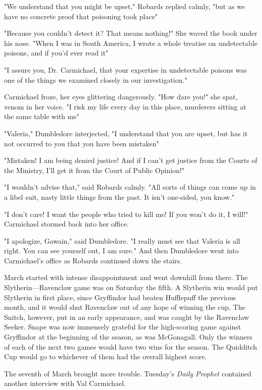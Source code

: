 "We understand that you might be upset," Robards replied calmly, "but as we have no concrete proof that poisoning took place{\el}"

"Because you couldn't detect it? That means nothing!" She waved the book under his nose. "When I was in South America, I wrote a whole treatise on undetectable poisons, and if you'd ever read it{\el}"

"I assure you, Dr. Carmichael, that your expertise in undetectable poisons was one of the things we examined closely in our investigation."

Carmichael froze, her eyes glittering dangerously. "How dare you!" she spat, venom in her voice. "I risk my life every day in this place, murderers sitting at the same table with me{\el}"

"Valeria," Dumbledore interjected, "I understand that you are upset, but has it not occurred to you that you have been mistaken{\el}"

"Mistaken! I am being denied justice! And if I can't get justice from the Courts of the Ministry, I'll get it from the Court of Public Opinion!"

"I wouldn't advise that," said Robards calmly. "All sorts of things can come up in a libel suit, nasty little things from the past. It isn't one-sided, you know."

"I don't care! I want the people who tried to kill me! If you won't do it, I will!" Carmichael stormed back into her office.

"I apologize, Gawain," said Dumbledore. "I really must see that Valeria is all right. You can see yourself out, I am sure." And then Dumbledore went into Carmichael's office as Robards continued down the stairs.

March started with intense disappointment and went downhill from there. The Slytherin—Ravenclaw game was on Saturday the fifth. A Slytherin win would put Slytherin in first place, since Gryffindor had beaten Hufflepuff the previous month, and it would shut Ravenclaw out of any hope of winning the cup. The Snitch, however, put in an early appearance, and was caught by the Ravenclaw Seeker. Snape was now immensely grateful for the high-scoring game against Gryffindor at the beginning of the season, as was McGonagall. Only the winners of each of the next two games would have two wins for the season. The Quidditch Cup would go to whichever of them had the overall highest score.

The seventh of March brought more trouble. Tuesday's \emph{Daily Prophet} contained another interview with Val Carmichael.

